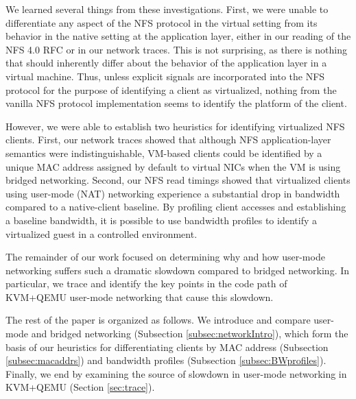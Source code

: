 \documentclass[11pt,pdftex,twocolumn]{article}
\begin{document}
We learned several things from these investigations. First, we were unable to differentiate any aspect of the NFS protocol in the virtual setting from its behavior in the native setting at the application layer, either in our reading of the NFS 4.0 RFC or in our network traces. This is not surprising, as there is nothing that should inherently differ about the behavior of the application layer in a virtual machine. Thus, unless explicit signals are incorporated into the NFS protocol for the purpose of identifying a client as virtualized, nothing from the vanilla NFS protocol implementation seems to identify the platform of the client. 

However, we were able to establish two heuristics for identifying virtualized NFS clients. First, our network traces showed that although NFS application-layer semantics were indistinguishable, VM-based clients could be identified by a unique MAC address assigned by default to virtual NICs when the VM is using bridged networking. Second, our NFS read timings showed that virtualized clients using user-mode (NAT) networking experience a substantial drop in bandwidth compared to a native-client baseline. By profiling client accesses and establishing a baseline bandwidth, it is possible to use bandwidth profiles to identify a virtualized guest in a controlled environment.

The remainder of our work focused on determining why and how user-mode networking suffers such a dramatic slowdown compared to bridged networking. In particular, we trace and identify the key points in the code path of KVM+QEMU user-mode networking that cause this slowdown.

The rest of the paper is organized as follows. We introduce and compare user-mode and bridged networking (Subsection \ref{subsec:networkIntro}), which form the basis of our heuristics for differentiating clients by MAC address (Subsection \ref{subsec:macaddrs}) and bandwidth profiles (Subsection \ref{subsec:BWprofiles}). Finally, we end by examining the source of slowdown in user-mode networking in KVM+QEMU (Section \ref{sec:trace}).


%
\end{document}
